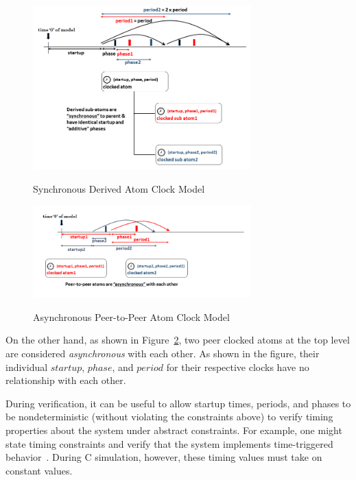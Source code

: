 \begin{figure}[h!]
\centering
\caption{Synchronous Derived Atom Clock Model}
 \includegraphics[width=0.75\textwidth]{figures/sync_clocked_atom.png}
\label{fig:sync_clock_atom_model}
\end{figure}

\begin{figure}[h!]
\centering
\caption{Asynchronous Peer-to-Peer Atom Clock Model}
 \includegraphics[width=0.75\textwidth]{figures/async_clocked_atom.png}
\label{fig:async_clock_atom_model}
\end{figure}

On the other hand, as shown in Figure~\ref{fig:async_clock_atom_model}, two peer clocked atoms at the top level are considered \emph{asynchronous} with each other. As shown in the figure, their individual $startup$, $phase$, and $period$ for their respective clocks have no relationship with each other.

During verification, it can be useful to allow startup times, periods, and phases to be nondeterministic (without violating the constraints above) to verify timing properties about the system under abstract constraints. For example, one might state timing constraints and verify that the system implements time-triggered behavior~\cite{fmcad07}. During C simulation, however, these timing values must take on constant values.


